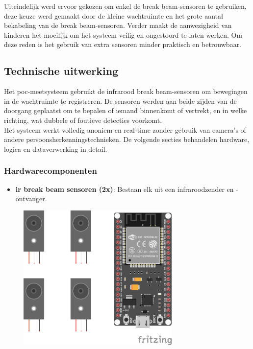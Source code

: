 Uiteindelijk werd ervoor gekozen om enkel de break beam-sensoren te gebruiken, deze keuze werd gemaakt door de kleine wachtruimte en het grote aantal bekabeling van de break beam-sensoren. Verder maakt de aanwezigheid van kinderen het moeilijk om het systeem veilig en ongestoord te laten werken. Om deze reden is het gebruik van extra sensoren minder praktisch en betrouwbaar. \\

\subsection{Technische uitwerking}
Het \gls{poc}-meetsysteem gebruikt de infrarood break beam-sensoren om bewegingen in de wachtruimte te registreren. De sensoren werden aan beide zijden van de doorgang geplaatst om te bepalen of iemand binnenkomt of vertrekt, en in welke richting, wat dubbele of foutieve detecties voorkomt.\\

Het systeem werkt volledig anoniem en real-time zonder gebruik van camera’s of andere persoonsherkenningstechnieken. De volgende secties behandelen hardware, logica en dataverwerking in detail.

\subsubsection{Hardwarecomponenten}
\begin{itemize}
    \textbf{ESP32-WROOM}: Wordt ingezet voor het uitlezen van de \gls{ir}-sensoren en het versturen van bezettingsdata naar InfluxDB via Wi-Fi.   
    \item \textbf{\gls{ir} break beam sensoren (2x)}: Bestaan elk uit een infraroodzender en -ontvanger.
\end{itemize}

\begin{figure}[htbp]
    \centering
    \includegraphics[width=8cm]{img/bp/wachtruimtes/technische_uitwerking/componenten.png}
    \label{fig:componenten}
\end{figure}

